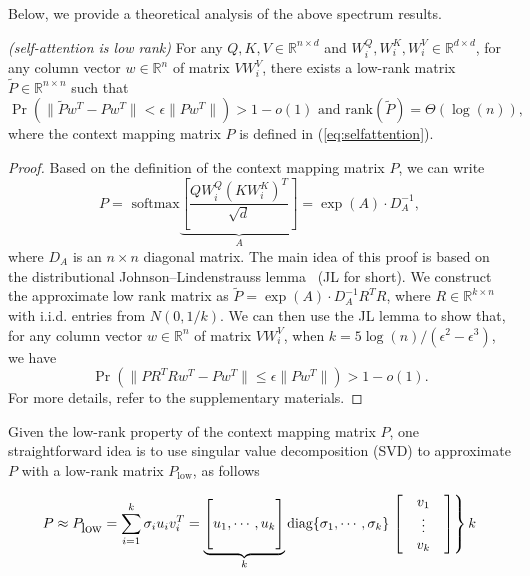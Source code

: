 Below, we provide a theoretical analysis of the above spectrum results.

\begin{theorem} \emph{(self-attention is low rank)}
\label{thm:low-rank}
For any $Q,K,V\in\mathbb{R}^{n\times d}$ and $W^Q_i, W^K_i, W^V_i \in \mathbb{R}^{d\times d}$, for any column vector $w\in\mathbb{R}^{n}$ of matrix $VW^V_i$, there exists a low-rank matrix $\tilde{P}\in\mathbb{R}^{n\times n}$ such that
\begin{equation}
\Pr(\|\tilde{P}w^T-Pw^T\|<\epsilon\|Pw^T\|)>1-o(1)  \mbox{ and }  \text{rank}(\tilde{P})=\Theta(\log(n)),
\end{equation}
where the context mapping matrix $P$ is defined in (\ref{eq:selfattention}).
\end{theorem}

\begin{proof}
Based on the definition of the context mapping matrix $P$, we can write 
\begin{equation}
P = \mbox{ softmax}\underbrace{\left[\frac{QW_i^Q(KW_i^K)^T}{\sqrt{d}}\right]}_{A}=\exp{(A)}\cdot D_{A}^{-1},
\end{equation}
where $D_A$ is an $n\times n$ diagonal matrix. The main idea of this proof is based on the distributional Johnson–Lindenstrauss lemma~\citep{lindenstrauss1984extensions} (JL for short). We construct the approximate low rank matrix as $\tilde{P}=\exp{(A)}\cdot D_{A}^{-1}R^TR$, where $R\in\mathbb{R}^{k\times n}$ with i.i.d. entries from $N(0, 1/k)$.  We can then use the JL lemma to show that, for any column vector $w\in\mathbb{R}^{n}$ of matrix $VW_i^V$, when $k=5\log(n)/(\epsilon^2-\epsilon^3)$, we have 
\begin{equation}
\Pr\left(\|PR^TRw^T-Pw^T\|\leq \epsilon\|Pw^T\|\right) > 1-o(1).
\end{equation}
For more details, refer to the supplementary materials.
\end{proof}

Given the low-rank property of the context mapping matrix $P$, one straightforward idea is to use singular value decomposition (SVD) to approximate $P$ with a low-rank matrix $P_\text{low}$, as follows

\begin{equation}\label{eq:svdapprox}
P \approx P_{\mbox{low}}=\sum\limits_{i=1}^{k}\sigma_iu_iv_i^T=\underbrace{\begin{bmatrix}
   \\
   u_1, \cdots,  u_k\\
   \\
\end{bmatrix}}_{k}\mbox{diag}\{\sigma_1, \cdots, \sigma_k\}\begin{rcases}
  \begin{bmatrix}
   &v_1 &\\
   &\vdots& \\
   &v_k &\\ 
\end{bmatrix}
\end{rcases}k
\end{equation}

